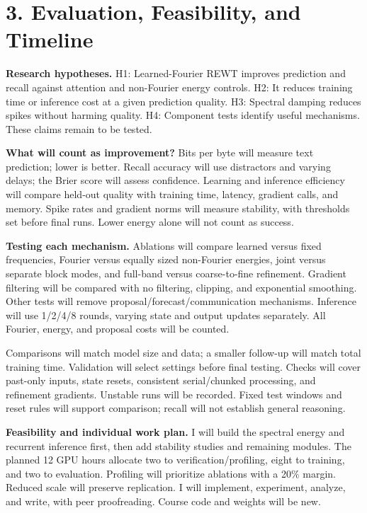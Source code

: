 \documentclass[11pt,letterpaper]{article}
\begin{document}
\newpage
\section*{3. Evaluation, Feasibility, and Timeline}

\textbf{Research hypotheses.} H1: Learned-Fourier REWT improves prediction and recall against attention and non-Fourier energy controls. H2: It reduces training time or inference cost at a given prediction quality. H3: Spectral damping reduces spikes without harming quality. H4: Component tests identify useful mechanisms. These claims remain to be tested.

\textbf{What will count as improvement?} Bits per byte will measure text prediction; lower is better. Recall accuracy will use distractors and varying delays; the Brier score will assess confidence. Learning and inference efficiency will compare held-out quality with training time, latency, gradient calls, and memory. Spike rates and gradient norms will measure stability, with thresholds set before final runs. Lower energy alone will not count as success.

\textbf{Testing each mechanism.} Ablations will compare learned versus fixed frequencies, Fourier versus equally sized non-Fourier energies, joint versus separate block modes, and full-band versus coarse-to-fine refinement. Gradient filtering will be compared with no filtering, clipping, and exponential smoothing. Other tests will remove proposal/forecast/communication mechanisms. Inference will use 1/2/4/8 rounds, varying state and output updates separately. All Fourier, energy, and proposal costs will be counted.

Comparisons will match model size and data; a smaller follow-up will match total training time. Validation will select settings before final testing. Checks will cover past-only inputs, state resets, consistent serial/chunked processing, and refinement gradients. Unstable runs will be recorded. Fixed test windows and reset rules will support comparison; recall will not establish general reasoning.

\textbf{Feasibility and individual work plan.} I will build the spectral energy and recurrent inference first, then add stability studies and remaining modules. The planned 12 GPU hours allocate two to verification/profiling, eight to training, and two to evaluation. Profiling will prioritize ablations with a 20\% margin. Reduced scale will preserve replication. I will implement, experiment, analyze, and write, with peer proofreading. Course code and weights will be new.
\end{document}
